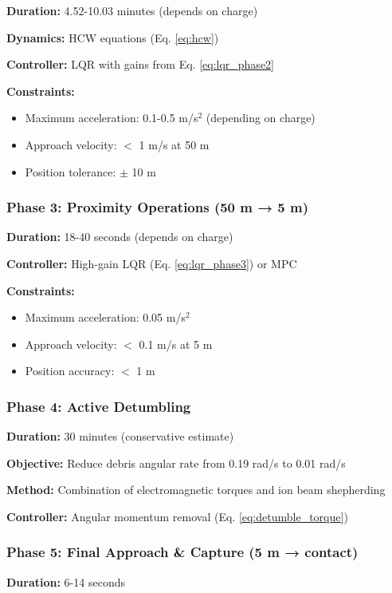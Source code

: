 \documentclass[12pt,a4paper]{article}
\begin{document}
\textbf{Duration:} 4.52-10.03 minutes (depends on charge)

\textbf{Dynamics:} HCW equations (Eq. \ref{eq:hcw})

\textbf{Controller:} LQR with gains from Eq. \ref{eq:lqr_phase2}

\textbf{Constraints:}
\begin{itemize}
\item Maximum acceleration: 0.1-0.5 m/s$^2$ (depending on charge)
\item Approach velocity: $<$ 1 m/s at 50 m
\item Position tolerance: $\pm$ 10 m
\end{itemize}

\subsubsection{Phase 3: Proximity Operations (50 m → 5 m)}

\textbf{Duration:} 18-40 seconds (depends on charge)

\textbf{Controller:} High-gain LQR (Eq. \ref{eq:lqr_phase3}) or MPC

\textbf{Constraints:}
\begin{itemize}
\item Maximum acceleration: 0.05 m/s$^2$
\item Approach velocity: $<$ 0.1 m/s at 5 m
\item Position accuracy: $<$ 1 m
\end{itemize}

\subsubsection{Phase 4: Active Detumbling}

\textbf{Duration:} 30 minutes (conservative estimate)

\textbf{Objective:} Reduce debris angular rate from 0.19 rad/s to 0.01 rad/s

\textbf{Method:} Combination of electromagnetic torques and ion beam shepherding

\textbf{Controller:} Angular momentum removal (Eq. \ref{eq:detumble_torque})

\subsubsection{Phase 5: Final Approach \& Capture (5 m → contact)}

\textbf{Duration:} 6-14 seconds
\end{document}
